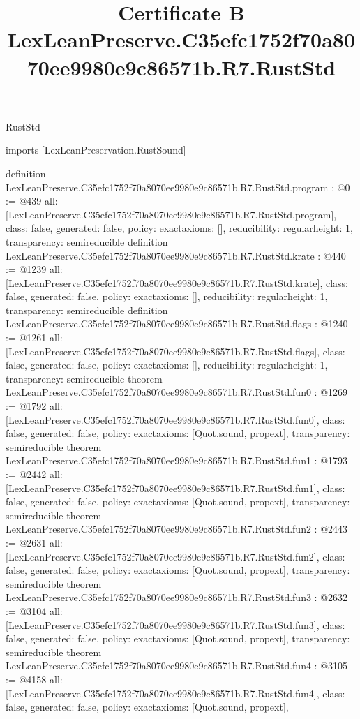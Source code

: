 \begin{lexlean}{RustStd}
\title{Certificate B LexLeanPreserve.C35efc1752f70a8070ee9980e9c86571b.R7.RustStd}
\begin{coremodule}
imports [LexLeanPreservation.RustSound]

definition LexLeanPreserve.C35efc1752f70a8070ee9980e9c86571b.R7.RustStd.program : @0 := @439 {
  all: [LexLeanPreserve.C35efc1752f70a8070ee9980e9c86571b.R7.RustStd.program],
  class: false,
  generated: false,
  policy: exact{axioms: []},
  reducibility: regular{height: 1},
  transparency: semireducible
}
definition LexLeanPreserve.C35efc1752f70a8070ee9980e9c86571b.R7.RustStd.krate : @440 := @1239 {
  all: [LexLeanPreserve.C35efc1752f70a8070ee9980e9c86571b.R7.RustStd.krate],
  class: false,
  generated: false,
  policy: exact{axioms: []},
  reducibility: regular{height: 1},
  transparency: semireducible
}
definition LexLeanPreserve.C35efc1752f70a8070ee9980e9c86571b.R7.RustStd.flags : @1240 := @1261 {
  all: [LexLeanPreserve.C35efc1752f70a8070ee9980e9c86571b.R7.RustStd.flags],
  class: false,
  generated: false,
  policy: exact{axioms: []},
  reducibility: regular{height: 1},
  transparency: semireducible
}
theorem LexLeanPreserve.C35efc1752f70a8070ee9980e9c86571b.R7.RustStd.fun0 : @1269 := @1792 {
  all: [LexLeanPreserve.C35efc1752f70a8070ee9980e9c86571b.R7.RustStd.fun0],
  class: false,
  generated: false,
  policy: exact{axioms: [Quot.sound, propext]},
  transparency: semireducible
}
theorem LexLeanPreserve.C35efc1752f70a8070ee9980e9c86571b.R7.RustStd.fun1 : @1793 := @2442 {
  all: [LexLeanPreserve.C35efc1752f70a8070ee9980e9c86571b.R7.RustStd.fun1],
  class: false,
  generated: false,
  policy: exact{axioms: [Quot.sound, propext]},
  transparency: semireducible
}
theorem LexLeanPreserve.C35efc1752f70a8070ee9980e9c86571b.R7.RustStd.fun2 : @2443 := @2631 {
  all: [LexLeanPreserve.C35efc1752f70a8070ee9980e9c86571b.R7.RustStd.fun2],
  class: false,
  generated: false,
  policy: exact{axioms: [Quot.sound, propext]},
  transparency: semireducible
}
theorem LexLeanPreserve.C35efc1752f70a8070ee9980e9c86571b.R7.RustStd.fun3 : @2632 := @3104 {
  all: [LexLeanPreserve.C35efc1752f70a8070ee9980e9c86571b.R7.RustStd.fun3],
  class: false,
  generated: false,
  policy: exact{axioms: [Quot.sound, propext]},
  transparency: semireducible
}
theorem LexLeanPreserve.C35efc1752f70a8070ee9980e9c86571b.R7.RustStd.fun4 : @3105 := @4158 {
  all: [LexLeanPreserve.C35efc1752f70a8070ee9980e9c86571b.R7.RustStd.fun4],
  class: false,
  generated: false,
  policy: exact{axioms: [Quot.sound, propext]},
}
\end{coremodule}
\end{lexlean}
